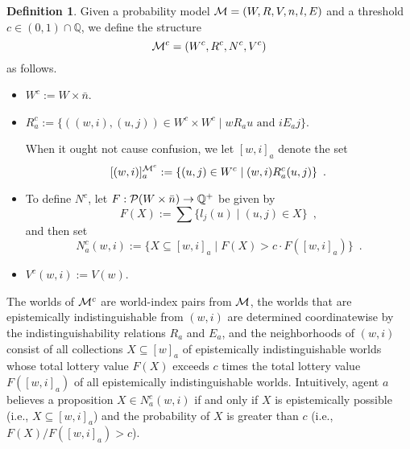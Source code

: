 \documentclass[12pt]{article}
\theoremstyle{definition}
\newtheorem{definition}[theorem]{Definition}
\newcommand{\Rat}{\mathbb{Q}}  %
\newcommand{\pow}{{\cal P}}    %
\newcommand{\M}{{\cal M}}      %
\begin{document}
\begin{definition} Given a probability model $\M = (W,R,V,n,l,E)$ and
  a threshold $c\in(0,1)\cap\Rat$, we define the structure
 \[
 \M^c = (W^c,R^c,N^c, V^c)
 \]
 as follows.
 \begin{itemize} 
 \item $W^c := W\times\bar{n}$.

 \item $R^c_a:=\{((w,i),(u,j))\in W^c\times W^c\mid wR_au \text{ and }
   iE_aj\}$.

   When it ought not cause confusion, we let $[w,i]_a$ denote the set
   \[
   [(w,i)]^{\M^c}_a:=\{(u,j)\in W^c\mid (w,i)R^c_a(u,j)\} \enspace.
   \]

 \item To define $N^c$, let $F:\pow(W\times \bar{n})\to \Rat^+$ be
   given by
   \[
   F(X) := 
   \sum \{ l_j(u) \mid (u,j) \in X \} \enspace,
   \]
   and then set
   \[
   \textstyle N^c_a (w,i) := \{ X \subseteq [w,i]_a
   \mid F(X) > c\cdot F([w,i]_a) \} \enspace.
   \]
   
 \item $V^c(w,i) := V(w)$.
 \end{itemize}
\end{definition}

The worlds of $\M^c$ are world-index pairs from $\M$, the worlds that
are epistemically indistinguishable from $(w,i)$ are determined
coordinatewise by the indistinguishability relations $R_a$ and $E_a$,
and the neighborhoods of $(w,i)$ consist of all collections
$X\subseteq [w]_a$ of epistemically indistinguishable worlds whose
total lottery value $F(X)$ exceeds $c$ times the total lottery value
$F([w,i]_a)$ of all epistemically indistinguishable worlds.
Intuitively, agent $a$ believes a proposition $X\in N^c_a(w,i)$ if and
only if $X$ is epistemically possible (i.e., $X\subseteq[w,i]_a$) and
the probability of $X$ is greater than $c$ (i.e.,
$F(X)/F([w,i]_a)>c$).
\end{document}
